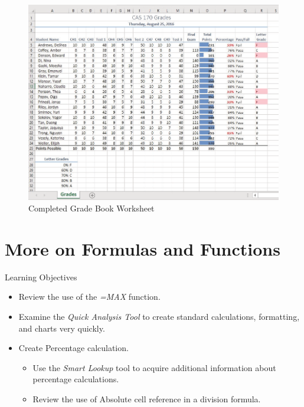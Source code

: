\begin{figure}[H]
	\centering
	\includegraphics[width=\maxwidth{.95\linewidth}]{gfx/ch03_fig01}
	\caption{Completed Grade Book Worksheet}
	\label{03:fig01}
\end{figure}

\section{More on Formulas and Functions}

\begin{center}
	\begin{objbox}{Learning Objectives}
		\begin{itemize}
			\setlength{\itemsep}{0pt}
			\setlength{\parskip}{0pt}
			\setlength{\parsep}{0pt}
			
			\item Review the use of the \textit{=MAX} function.
			\item Examine the \textit{Quick Analysis Tool} to create standard calculations, formatting, and charts very quickly.
			\item Create Percentage calculation.

			\begin{itemize}
				\setlength{\itemsep}{0pt}
				\setlength{\parskip}{0pt}
				\setlength{\parsep}{0pt}

				\item Use the \textit{Smart Lookup} tool to acquire additional information about percentage calculations.
				\item Review the use of Absolute cell reference in a division formula.
			\end{itemize}

		\end{itemize}
	\end{objbox}
\end{center}

